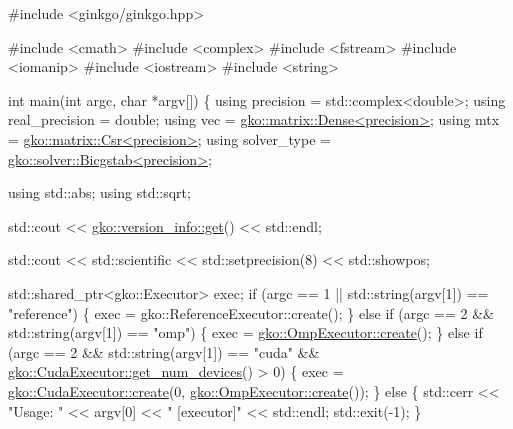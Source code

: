 \begin{DoxyCodeInclude}
\textcolor{preprocessor}{#include <ginkgo/ginkgo.hpp>}


\textcolor{preprocessor}{#include <cmath>}
\textcolor{preprocessor}{#include <complex>}
\textcolor{preprocessor}{#include <fstream>}
\textcolor{preprocessor}{#include <iomanip>}
\textcolor{preprocessor}{#include <iostream>}
\textcolor{preprocessor}{#include <string>}


\textcolor{keywordtype}{int} main(\textcolor{keywordtype}{int} argc, \textcolor{keywordtype}{char} *argv[])
\{
    \textcolor{keyword}{using} precision = std::complex<double>;
    \textcolor{keyword}{using} real\_precision = double;
    \textcolor{keyword}{using} vec = \hyperlink{classgko_1_1matrix_1_1Dense}{gko::matrix::Dense<precision>};
    \textcolor{keyword}{using} mtx = \hyperlink{classgko_1_1matrix_1_1Csr}{gko::matrix::Csr<precision>};
    \textcolor{keyword}{using} solver\_type = \hyperlink{classgko_1_1solver_1_1Bicgstab}{gko::solver::Bicgstab<precision>};

    \textcolor{keyword}{using} std::abs;
    \textcolor{keyword}{using} std::sqrt;

    std::cout << \hyperlink{classgko_1_1version__info_a6daeb8a087cfb57fa055526fc133d8eb}{gko::version\_info::get}() << std::endl;

    std::cout << std::scientific << std::setprecision(8) << std::showpos;

    std::shared\_ptr<gko::Executor> exec;
    \textcolor{keywordflow}{if} (argc == 1 || std::string(argv[1]) == \textcolor{stringliteral}{"reference"}) \{
        exec = gko::ReferenceExecutor::create();
    \} \textcolor{keywordflow}{else} \textcolor{keywordflow}{if} (argc == 2 && std::string(argv[1]) == \textcolor{stringliteral}{"omp"}) \{
        exec = \hyperlink{classgko_1_1OmpExecutor_a33ca05fdd0fc928ee262fc9425304874}{gko::OmpExecutor::create}();
    \} \textcolor{keywordflow}{else} \textcolor{keywordflow}{if} (argc == 2 && std::string(argv[1]) == \textcolor{stringliteral}{"cuda"} &&
               \hyperlink{classgko_1_1CudaExecutor_aef0258494d14de0e56149b920c5173e5}{gko::CudaExecutor::get\_num\_devices}() > 0) \{
        exec = \hyperlink{classgko_1_1CudaExecutor_a2718a92034350650ef406ffdb60db090}{gko::CudaExecutor::create}(0, 
      \hyperlink{classgko_1_1OmpExecutor_a33ca05fdd0fc928ee262fc9425304874}{gko::OmpExecutor::create}());
    \} \textcolor{keywordflow}{else} \{
        std::cerr << \textcolor{stringliteral}{"Usage: "} << argv[0] << \textcolor{stringliteral}{" [executor]"} << std::endl;
        std::exit(-1);
    \}


\end{DoxyCodeInclude}
